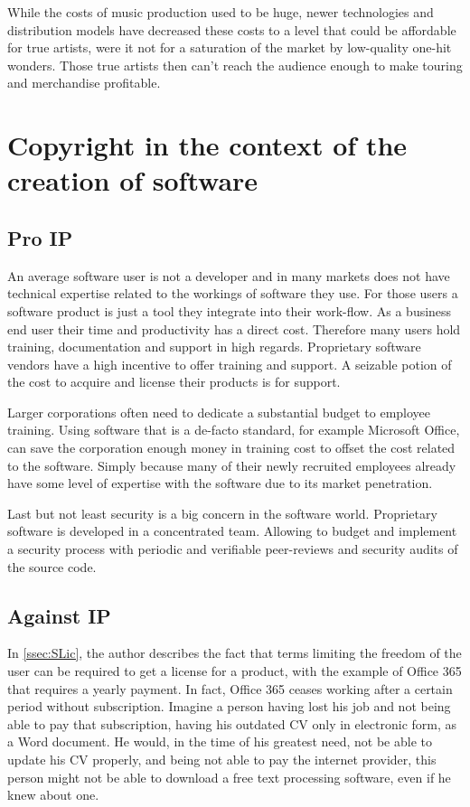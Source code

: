 \documentclass[a4paper]{report}
\begin{document}
While the costs of music production used to be huge, newer technologies and distribution models have decreased these costs to a level that could be affordable for true artists, were it not for a saturation of the market by low-quality one-hit wonders. Those true artists then can't reach the audience enough to make touring and merchandise profitable.

\section{Copyright in the context of the creation of software}
\label{sec:CopySoft}

\subsection{Pro IP}
An average software user is not a developer and in many markets does not have technical expertise related to the workings of software they use. For those users a software product is just a tool they integrate into their work-flow. As a business end user their time and productivity has a direct cost. Therefore many users hold training, documentation and support in high regards. Proprietary software vendors have a high incentive to offer training and support. A seizable potion of the cost to acquire and license their products is for support. 

Larger corporations often need to dedicate a substantial budget to employee training. Using software that is a de-facto standard, for example Microsoft Office, can save the corporation enough money in training cost to offset the cost related to the software. Simply because many of their newly recruited employees already have some level of expertise with the software due to its market penetration.

Last but not least security is a big concern in the software world. Proprietary software is developed in a concentrated team. Allowing to budget and implement a security process with periodic and verifiable peer-reviews and security audits of the source code. 

\subsection{Against IP}
In \ref{ssec:SLic}, the author describes the fact that terms limiting the freedom of the user can be required to get a license for a product, with the example of Office 365 that requires a yearly payment. In fact, Office 365 ceases working after a certain period without subscription. Imagine a person having lost his job and not being able to pay that subscription, having his outdated CV only in electronic form, as a Word document. He would, in the time of his greatest need, not be able to update his CV properly, and being not able to pay the internet provider, this person might not be able to download a free text processing software, even if he knew about one. 
\end{document}
